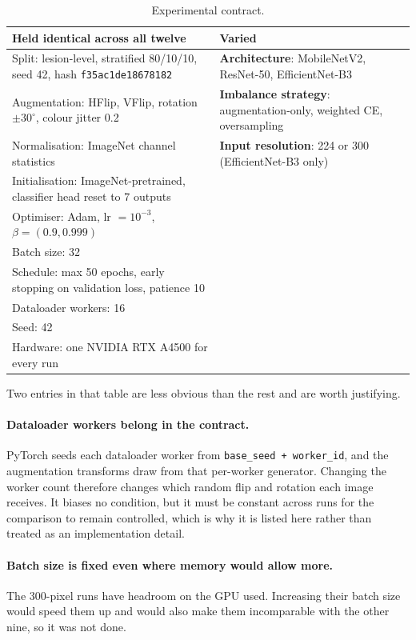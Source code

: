 \begin{table}[htbp]
\centering
\caption{Experimental contract.}
\label{tab:contract}
\small
\renewcommand{\arraystretch}{1.2}
\begin{tabular}{@{}p{7.4cm}p{5.6cm}@{}}
\toprule
\textbf{Held identical across all twelve} & \textbf{Varied} \\
\midrule
Split: lesion-level, stratified 80/10/10, seed 42, hash \texttt{f35ac1de18678182}
  & \textbf{Architecture}: MobileNetV2, ResNet-50, EfficientNet-B3 \\
Augmentation: HFlip, VFlip, rotation $\pm 30^{\circ}$, colour jitter 0.2
  & \textbf{Imbalance strategy}: augmentation-only, weighted CE, oversampling \\
Normalisation: ImageNet channel statistics
  & \textbf{Input resolution}: 224 or 300 (EfficientNet-B3 only) \\
Initialisation: ImageNet-pretrained, classifier head reset to 7 outputs & \\
Optimiser: Adam, lr $=10^{-3}$, $\beta = (0.9, 0.999)$ & \\
Batch size: 32 & \\
Schedule: max 50 epochs, early stopping on validation loss, patience 10 & \\
Dataloader workers: 16 & \\
Seed: 42 & \\
Hardware: one NVIDIA RTX A4500 for every run & \\
\bottomrule
\end{tabular}
\end{table}

Two entries in that table are less obvious than the rest and are worth justifying.

\paragraph{Dataloader workers belong in the contract.} PyTorch seeds each dataloader
worker from \texttt{base\_seed + worker\_id}, and the augmentation transforms draw from
that per-worker generator. Changing the worker count therefore changes which random flip
and rotation each image receives. It biases no condition, but it must be constant across
runs for the comparison to remain controlled, which is why it is listed here rather than
treated as an implementation detail.

\paragraph{Batch size is fixed even where memory would allow more.} The 300-pixel runs
have headroom on the GPU used. Increasing their batch size would speed them up and would
also make them incomparable with the other nine, so it was not done.

